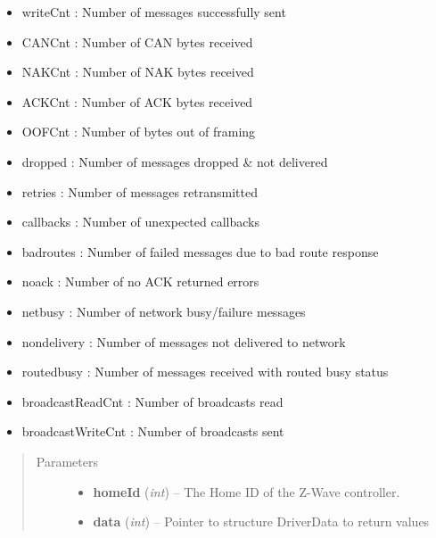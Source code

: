 \documentclass[letterpaper,10pt,english]{sphinxmanual}
\begin{document}
\begin{fulllineitems}
\begin{fulllineitems}
\begin{itemize}
\item {} 
writeCnt : Number of messages successfully sent

\item {} 
CANCnt : Number of CAN bytes received

\item {} 
NAKCnt : Number of NAK bytes received

\item {} 
ACKCnt : Number of ACK bytes received

\item {} 
OOFCnt : Number of bytes out of framing

\item {} 
dropped : Number of messages dropped \& not delivered

\item {} 
retries : Number of messages retransmitted

\item {} 
callbacks : Number of unexpected callbacks

\item {} 
badroutes : Number of failed messages due to bad route response

\item {} 
noack : Number of no ACK returned errors

\item {} 
netbusy : Number of network busy/failure messages

\item {} 
nondelivery : Number of messages not delivered to network

\item {} 
routedbusy : Number of messages received with routed busy status

\item {} 
broadcastReadCnt : Number of broadcasts read

\item {} 
broadcastWriteCnt : Number of broadcasts sent

\end{itemize}
\begin{quote}\begin{description}
\item[{Parameters}] \leavevmode\begin{itemize}
\item {} 
\textbf{homeId} (\emph{int}) -- The Home ID of the Z-Wave controller.

\item {} 
\textbf{data} (\emph{int}) -- Pointer to structure DriverData to return values


\end{itemize}
\end{description}
\end{quote}
\end{fulllineitems}
\end{fulllineitems}
\end{document}
